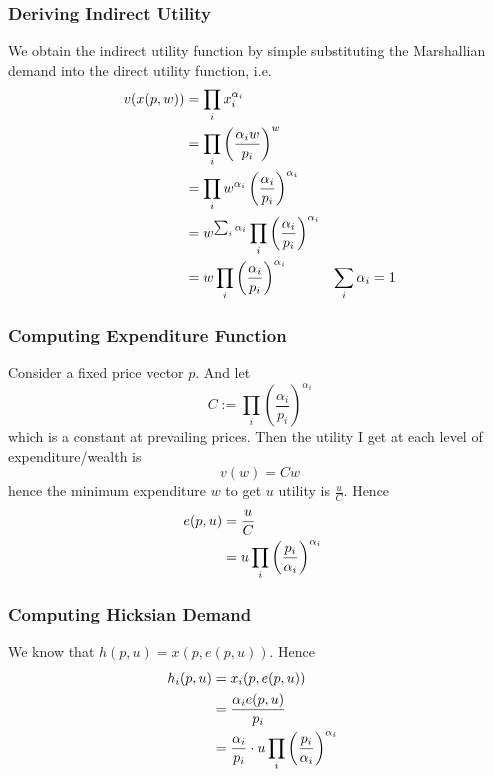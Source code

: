\subsubsection{Deriving Indirect Utility}

We obtain the indirect utility function by simple substituting the
Marshallian demand into the direct utility function, i.e.
\begin{align}
  v(x(p, w)) & = \prod_i x_i^{\alpha_i} & \notag \\
  & = \prod_i \left(\frac{\alpha_i w}{p_i}\right)^w & \notag \\
  & = \prod_i w^{\alpha_i} \left(\frac{\alpha_i}{p_i}\right)^{\alpha_i} & \notag \\
  & = w^{\sum_i \alpha_i} \prod_i \left(\frac{\alpha_i}{p_i}\right)^{\alpha_i} & \notag \\
  & = w \prod_i \left(\frac{\alpha_i}{p_i}\right)^{\alpha_i} & \sum_i \alpha_i = 1 \notag 
\end{align}


\subsubsection{Computing Expenditure Function}

Consider a fixed price vector $p$. And let 
\[
C := \prod_i \left(\frac{\alpha_i}{p_i}\right)^{\alpha_i}
\]
which is a constant at prevailing prices. Then the utility I get at
each level of expenditure/wealth is
\[
v(w) = Cw
\]
hence the minimum expenditure $w$ to get $u$ utility is $\frac{u}{C}$. 
Hence 
\begin{align}
  e(p,u) & = \frac{u}{C} & \notag \\
  & = u \prod_i \left(\frac{p_i}{\alpha_i}\right)^{\alpha_i} & \notag
\end{align}



\subsubsection{Computing Hicksian Demand}

We know that $h(p, u) = x(p, e(p,u))$. Hence
\begin{align}
  h_i(p,u) & = x_i(p, e(p,u)) & \notag \\
  & = \frac{\alpha_i e(p, u)}{p_i} & \notag \\
  & = \frac{\alpha_i}{p_i} \cdot
  u \prod_i \left(\frac{p_i}{\alpha_i}\right)^{\alpha_i} & \notag
\end{align}

